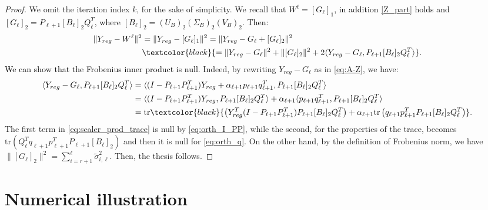 \documentclass[pdflatex,sn-mathphys-num]{sn-jnl}
\numberwithin{equation}{section}%
\newcommand{\cZ}{G}
\newcommand{\tsvd}[1]{[ #1 ]_2}
\newcommand{\REV}[1]{\textcolor{black}{#1}}
\newcommand{\ste}[1]{\textcolor{black}{#1}}
\theoremstyle{thmstyleone}%
\theoremstyle{thmstyletwo}%
\theoremstyle{thmstylethree}%
\begin{document}
\begin{proof}
We omit the iteration index $k$, for the sake of simplicity. We recall that \REV{$W^\ell=[\cZ_\ell]_1$, in addition \eqref{Z_part} holds and $[\cZ_\ell]_{2}=P_{\ell+1} [B_\ell]_{2} Q_\ell^T$, where  $[B_\ell]_2=(U_B)_{2} (\Sigma_B)_{2} (V_B)_{2}$.
Then:
\begin{align*}
    \| Y_{reg}-W^\ell \| ^2& = \| Y_{reg}- [\cZ_\ell]_1 \| ^2 
    = \| Y_{reg}- \cZ_\ell+[\cZ_\ell]_{2} \| ^2\\
    &\ste{= \| Y_{reg}- \cZ_\ell \|^2 + \| [\cZ_\ell]_{2} \| ^2 + 2 \langle Y_{reg}- \cZ_\ell, P_{\ell+1} [B_\ell]_{2} Q_\ell^T \rangle} .
\end{align*}}
\REV{We can show that the Frobenius inner product is null.} Indeed, by rewriting $Y_{reg}- \cZ_\ell$ as in \eqref{eq:A-Z}, we have:
\begin{align}
    \langle Y_{reg}- \cZ_\ell, P_{\ell+1} [B_\ell]_{2} Q_\ell^T \rangle  &= 
    \langle (I - P_{\ell+1} P_{\ell+1}^T) Y_{reg}  + \alpha_{\ell+1} p_{\ell+1} q_{\ell+1}^T, P_{\ell+1} [B_\ell]_{2} Q_\ell^T \rangle  \nonumber\\
    & = \langle (I - P_{\ell+1} P_{\ell+1}^T) Y_{reg}, P_{\ell+1} [B_\ell]_{2} Q_\ell^T \rangle + \alpha_{\ell+1}\langle p_{\ell+1} q_{\ell+1}^T, P_{\ell+1} [B_\ell]_{2} Q_\ell^T \rangle  \nonumber\\
    &= \textrm{tr} \ste{\left( Y_{reg}^T (I - P_{\ell+1} P_{\ell+1}^T) P_{\ell+1} [B_\ell]_{2} Q_\ell^T \right) + \alpha_{\ell+1} \textrm{tr} \left( q_{\ell+1} p_{\ell+1}^T P_{\ell+1} [B_\ell]_{2} Q_\ell^T \right)}. \label{eq:scaler_prod_trace}
\end{align}
The first term in \eqref{eq:scaler_prod_trace} is null by \eqref{eq:orth_I_PP}, while the second, for the properties of the trace, becomes $\textrm{tr} \left( Q_\ell^T q_{\ell+1} p_{\ell+1}^T P_{\ell+1} [B_\ell]_{2} \right)$ and then it is null for \eqref{eq:orth_q}.
On the other hand, by the definition of Frobenius norm, we have $\| \tsvd{\cZ_\ell} \| ^2 = \sum_{i=r+1}^\ell \tilde \sigma_{i,\ell}^2$. Then, the thesis follows.
\end{proof}

\section{Numerical illustration}
\end{document}
